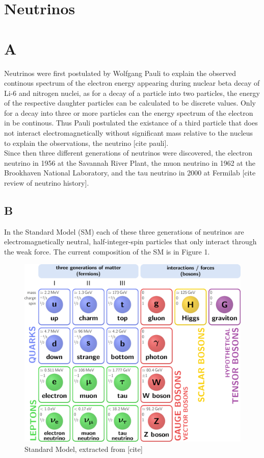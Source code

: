 \documentclass[a4paper,12pt,numbered]{article}
\begin{document}
\section{Neutrinos}



\section{A}

Neutrinos were first postulated by Wolfgang Pauli to explain the observed continous spectrum of the electron energy appearing during nuclear beta decay of Li-6 and nitrogen nuclei, as for a decay of a particle into two particles, the energy of the respective daughter particles can be calculated to be discrete values. Only for a decay into three or more particles can the energy spectrum of the electron in be continous. Thus Pauli postulated the existance of a third particle that does not interact electromagnetically without significant mass relative to the nucleus to explain the observations, the neutrino [cite pauli]. 
\\
Since then three different generations of neutrinos were discovered, the electron neutrino in 1956 at the Savannah River Plant, the muon neutrino in 1962 at the Brookhaven National Laboratory, and the tau neutrino in 2000 at Fermilab [cite review of neutrino history].

\subsection{B}

In the Standard Model (SM) each of these three generations of neutrinos are electromagnetically neutral, half-integer-spin particles that only interact through the weak force. The current composition of the SM is in Figure 1.


\begin{figure}[H]
\begin{center}
\includegraphics[width=0.80 \textwidth]{Neutrino_Figures/SM.png}
\caption{Standard Model, extracted from [cite]}
\end{center}
\end{figure}
\end{document}
